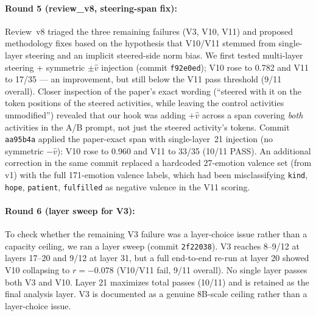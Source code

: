 \documentclass[11pt,a4paper]{article}
\begin{document}
\paragraph{Round 5 (review\_v8, steering-span fix):} Review~v8
triaged the three remaining failures (V3, V10, V11) and proposed
methodology fixes based on the hypothesis that V10/V11 stemmed from
single-layer steering and an implicit steered-side norm bias.
We first tested multi-layer steering + symmetric $\pm\hat{v}$
injection (commit \texttt{f92e0ed}); V10 rose to 0.782 and V11 to
17/35 --- an improvement, but still below the V11 pass threshold
(9/11 overall).  Closer inspection of the paper's exact wording
(``steered with it on the token positions of the steered activities,
while leaving the control activities unmodified'') revealed that our
hook was adding $+\hat{v}$ across a span covering \emph{both}
activities in the A/B prompt, not just the steered activity's
tokens.  Commit \texttt{aa95b4a} applied the paper-exact span with
single-layer~21 injection (no symmetric $-\hat{v}$): V10 rose to
0.960 and V11 to 33/35 (10/11 PASS).  An additional correction in
the same commit replaced a hardcoded 27-emotion valence set (from v1)
with the full 171-emotion valence labels, which had been misclassifying
\texttt{kind}, \texttt{hope}, \texttt{patient}, \texttt{fulfilled} as
negative valence in the V11 scoring.

\paragraph{Round 6 (layer sweep for V3):} To check whether the
remaining V3 failure was a layer-choice issue rather than a capacity
ceiling, we ran a layer sweep (commit \texttt{2f22038}).  V3 reaches
8--9/12 at layers 17--20 and 9/12 at layer 31, but a full end-to-end
re-run at layer 20 showed V10 collapsing to $r{=}{-}0.078$ (V10/V11
fail, 9/11 overall).  No single layer passes both V3 and V10.  Layer
21 maximizes total passes (10/11) and is retained as the final
analysis layer.  V3 is documented as a genuine 8B-scale ceiling
rather than a layer-choice issue.
\end{document}
